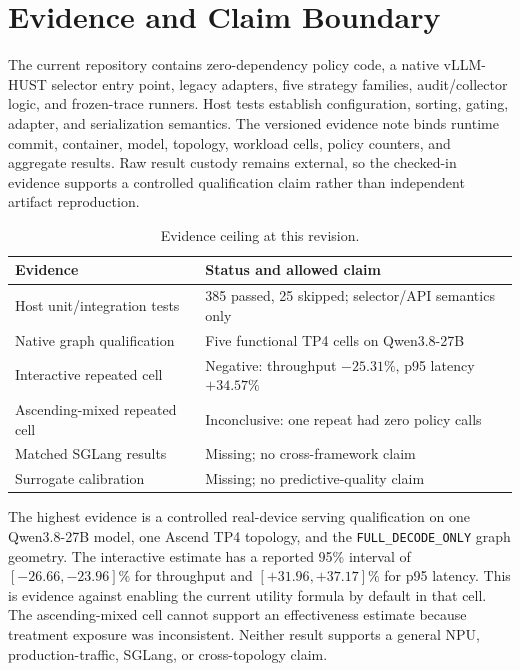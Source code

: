 \documentclass[10pt,twocolumn]{article}
\begin{document}
\section{Evidence and Claim Boundary}
The current repository contains zero-dependency policy code, a native vLLM-HUST selector entry point, legacy adapters, five strategy families, audit/collector logic, and frozen-trace runners. Host tests establish configuration, sorting, gating, adapter, and serialization semantics. The versioned evidence note  binds runtime commit, container, model, topology, workload cells, policy counters, and aggregate results. Raw result custody remains external, so the checked-in evidence supports a controlled qualification claim rather than independent artifact reproduction.

\begin{table}[t]
\centering\small
\caption{Evidence ceiling at this revision.}
\begin{tabularx}{\columnwidth}{@{}p{}X@{}}
\toprule
Evidence & Status and allowed claim \\
\midrule
Host unit/integration tests & 385 passed, 25 skipped; selector/API semantics only \\
Native graph qualification & Five functional TP4 cells on Qwen3.8-27B \\
Interactive repeated cell & Negative: throughput $-25.31\%$, p95 latency $+34.57\%$ \\
Ascending-mixed repeated cell & Inconclusive: one repeat had zero policy calls \\
Matched SGLang results & Missing; no cross-framework claim \\
Surrogate calibration & Missing; no predictive-quality claim \\
\bottomrule
\end{tabularx}
\end{table}

The highest evidence is a controlled real-device serving qualification on one Qwen3.8-27B model, one Ascend TP4 topology, and the \texttt{FULL\_DECODE\_ONLY} graph geometry. The interactive estimate has a reported 95\% interval of $[-26.66,-23.96]\%$ for throughput and $[+31.96,+37.17]\%$ for p95 latency. This is evidence against enabling the current utility formula by default in that cell. The ascending-mixed cell cannot support an effectiveness estimate because treatment exposure was inconsistent. Neither result supports a general NPU, production-traffic, SGLang, or cross-topology claim.
\end{document}
